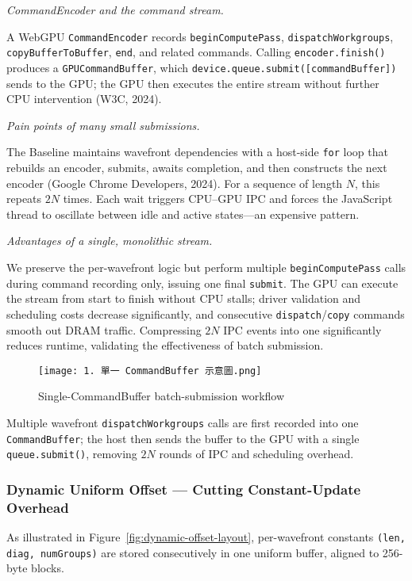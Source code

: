 \documentclass[PhD]{PHlab-thesis}
\begin{document}
\textit{CommandEncoder and the command stream.}

A WebGPU \texttt{CommandEncoder} records \texttt{beginComputePass}, \texttt{dispatchWorkgroups}, \texttt{copyBufferToBuffer}, \texttt{end}, and related commands.  
Calling \texttt{encoder.finish()} produces a \texttt{GPUCommandBuffer}, which \texttt{device.queue.submit([commandBuffer])} sends to the GPU; the GPU then executes the entire stream without further CPU intervention (W3C, 2024).

\textit{Pain points of many small submissions.}

The Baseline maintains wavefront dependencies with a host-side \texttt{for} loop that rebuilds an encoder, submits, awaits completion, and then constructs the next encoder (Google Chrome Developers, 2024). For a sequence of length $N$, this repeats $2N$ times. Each wait triggers CPU–GPU IPC and forces the JavaScript thread to oscillate between idle and active states—an expensive pattern.

\textit{Advantages of a single, monolithic stream.}

We preserve the per-wavefront logic but perform multiple \texttt{beginComputePass} calls during command recording only, issuing one final \texttt{submit}. The GPU can execute the stream from start to finish without CPU stalls; driver validation and scheduling costs decrease significantly, and consecutive \texttt{dispatch}/\texttt{copy} commands smooth out DRAM traffic. Compressing $2N$ IPC events into one significantly reduces runtime, validating the effectiveness of batch submission.
\begin{figure}[htbp]
    \centering
    \texttt{[image: 1. 單一 CommandBuffer 示意圖.png]}
    \caption{Single-CommandBuffer batch-submission workflow}
    \label{fig:scb-batch-workflow}
\end{figure}

Multiple wavefront \texttt{dispatchWorkgroups} calls are first recorded into one \texttt{CommandBuffer}; the host then sends the buffer to the GPU with a single \texttt{queue.submit()}, removing $2N$ rounds of IPC and scheduling overhead.

\subsubsection{Dynamic Uniform Offset — Cutting Constant-Update Overhead}
As illustrated in Figure~\ref{fig:dynamic-offset-layout}, per-wavefront constants \texttt{(len, diag, numGroups)} are stored consecutively in one uniform buffer, aligned to 256-byte blocks.
\end{document}
